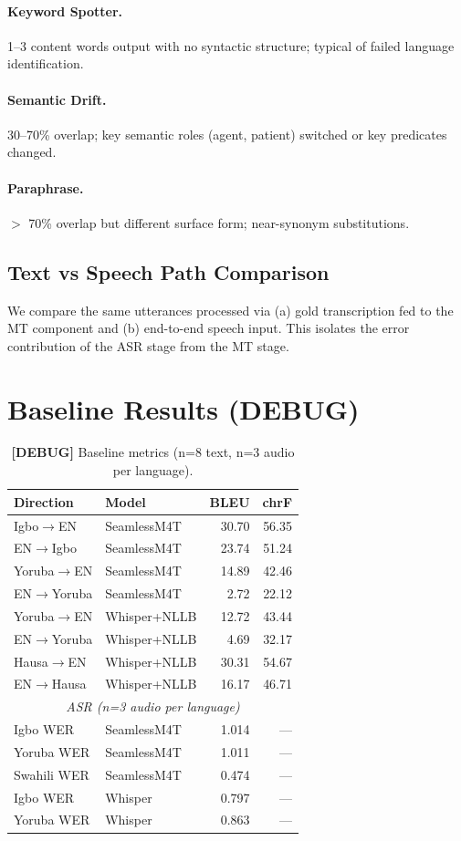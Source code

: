 \documentclass[11pt,a4paper]{article}
\begin{document}
\paragraph{Keyword Spotter.} 1–3 content words output with no syntactic structure; typical of failed language identification.

\paragraph{Semantic Drift.} 30–70\% overlap; key semantic roles (agent, patient) switched or key predicates changed.

\paragraph{Paraphrase.} $>$ 70\% overlap but different surface form; near-synonym substitutions.

\subsection{Text vs Speech Path Comparison}
We compare the same utterances processed via (a) gold transcription fed to the MT component and (b) end-to-end speech input. This isolates the error contribution of the ASR stage from the MT stage.

\section{Baseline Results (DEBUG)}

\begin{table}[t]
\centering
\small
\caption{\textbf{[DEBUG]} Baseline metrics (n=8 text, n=3 audio per language).}
\label{tab:p4_debug_baselines}
\begin{tabular}{llrr}
\toprule
\textbf{Direction} & \textbf{Model} & \textbf{BLEU} & \textbf{chrF} \\
\midrule
Igbo$\to$EN   & SeamlessM4T  & 30.70 & 56.35 \\
EN$\to$Igbo   & SeamlessM4T  & 23.74 & 51.24 \\
Yoruba$\to$EN & SeamlessM4T  & 14.89 & 42.46 \\
EN$\to$Yoruba & SeamlessM4T  &  2.72 & 22.12 \\
Yoruba$\to$EN & Whisper+NLLB & 12.72 & 43.44 \\
EN$\to$Yoruba & Whisper+NLLB &  4.69 & 32.17 \\
Hausa$\to$EN  & Whisper+NLLB & 30.31 & 54.67 \\
EN$\to$Hausa  & Whisper+NLLB & 16.17 & 46.71 \\
\midrule
\multicolumn{4}{c}{\textit{ASR (n=3 audio per language)}} \\
\midrule
Igbo WER   & SeamlessM4T & 1.014 & — \\
Yoruba WER & SeamlessM4T & 1.011 & — \\
Swahili WER & SeamlessM4T & 0.474 & — \\
Igbo WER   & Whisper & 0.797 & — \\
Yoruba WER & Whisper & 0.863 & — \\
\bottomrule
\end{tabular}
\end{table}
\end{document}

